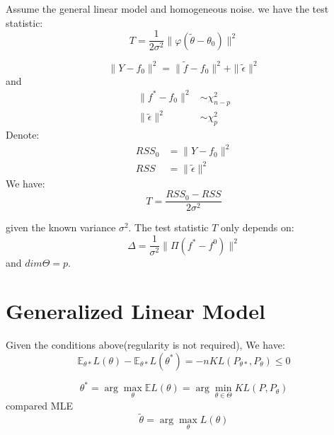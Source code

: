 \begin{theorem}
	Assume the general linear model and homogeneous noise. we have the test statistic:
	\begin{equation*}
		T = \frac{1}{2\sigma^2} \|\varphi(\tilde{\theta} - \theta_0)\|^2
	\end{equation*}
	
	\begin{equation*}
		\|Y - f_0\|^2 = \|\tilde{f} - f_0 \|^2 + \|\tilde{\epsilon}\|^2
	\end{equation*}
	and 
	\begin{align*}
		\|f^* - f_0 \|^2 &\sim \chi_{n - p}^2\\
		\|\tilde{\epsilon}\|^2 &\sim \chi_p^2
	\end{align*}
	Denote:
	\begin{align*}
		RSS_0 &= \|Y - f_0\|^2\\
		RSS &= \|\tilde{\epsilon}\|^2
	\end{align*}
	We have:\begin{equation*}
		T = \frac{RSS_0 - RSS}{2\sigma^2}
	\end{equation*}
\end{theorem}

\begin{remark}
given the known variance $\sigma^2$. The test statistic $T$ only depends on:
\begin{equation*}
	\Delta = \frac{1}{\sigma^2} \|\Pi(f^* - f^0)\|^2
\end{equation*}	
and $dim \Theta = p$.
\end{remark}





\newpage


\section{Generalized Linear Model}
\begin{lemma}
	Given the conditions above(regularity is not required), We have:
	\begin{equation*}
	\mathbb{E}_{\theta*} L(\theta) - \mathbb{E}_{\theta*} L(\theta^*) = -n KL(P_{\theta*}, P_{\theta}) \leq 0		
	\end{equation*}

\end{lemma}

\begin{corollary}
	\begin{equation}\label{est:BPF}
		\theta^* = \arg \max_{\theta} \mathbb{E} L(\theta) = \arg \min_{\theta \in \Theta} KL(P, P_\theta)
	\end{equation}
	compared MLE
	\begin{equation} \label{est: MLE}
		\tilde{\theta} = \arg \max_\theta L(\theta)
	\end{equation}
\end{corollary}


